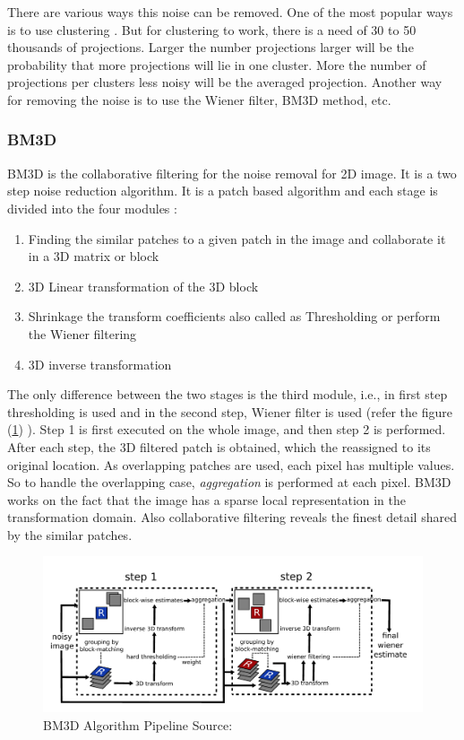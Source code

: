 \documentclass[twoside]{iitbreport}
\begin{document}
There are various ways this noise can be removed. One of the most popular ways is to use clustering \cite{mallick2006structure}. But for clustering to work, there is a need of 30 to 50 thousands of projections. Larger the number projections larger will be the probability that more projections will lie in one cluster. More the number of projections per clusters less noisy will be the averaged projection. Another way for removing the noise is to use the Wiener filter, BM3D method, etc.

\subsubsection{BM3D}\label{subsubsec:BM3D}
BM3D \cite{dabov2009BM3D}\cite{lebrun2012BM3Danalysis} is the collaborative filtering for the noise removal for 2D image. It is a two step noise reduction algorithm. It is a patch based algorithm and each stage is divided into the four modules :
\begin{enumerate}
  \item Finding the similar patches to a given patch in the image and collaborate it in a 3D matrix or block
  \item 3D Linear transformation of the 3D block
  \item Shrinkage the transform coefficients also called as Thresholding or perform the Wiener filtering
  \item 3D inverse transformation
\end{enumerate}

The only difference between the two stages is the third module, i.e., in first step thresholding is used and in the second step, Wiener filter is used (refer the figure (\ref{fig: bm3d}) ). Step 1 is first executed on the whole image, and then step 2 is performed. After each step, the 3D filtered patch is obtained, which the reassigned to its original location. As overlapping patches are used, each pixel has multiple values. So to handle the overlapping case, \textit{aggregation} is performed at each pixel. BM3D works on the fact that the image has a sparse local representation in the transformation domain. Also collaborative filtering reveals the finest detail shared by the similar patches.


\begin{figure}[h]
\includegraphics[width=0.9\linewidth]{bm3d.png}
\centering
\captionsetup{justification=centering}
\caption{ BM3D Algorithm Pipeline Source: \cite{lebrun2012BM3Danalysis} }
\label{fig: bm3d}
\end{figure}
\end{document}
